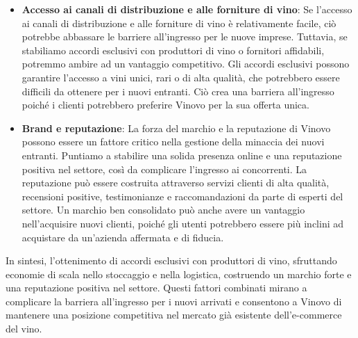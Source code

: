 \documentclass[12pt, a4paper]{article}
\begin{document}
\begin{itemize}
    \item \textbf{Accesso ai canali di distribuzione e alle forniture di vino}:
          Se l'accesso ai canali di distribuzione e alle forniture di vino è relativamente facile, ciò potrebbe abbassare le barriere all'ingresso per le nuove imprese. Tuttavia, se stabiliamo accordi esclusivi con produttori di vino o fornitori affidabili, potremmo ambire ad un vantaggio competitivo. Gli accordi esclusivi possono garantire l'accesso a vini unici, rari o di alta qualità, che potrebbero essere difficili da ottenere per i nuovi entranti. Ciò crea una barriera all'ingresso poiché i clienti potrebbero preferire Vinovo per la sua offerta unica.

    \item \textbf{Brand e reputazione}:
          La forza del marchio e la reputazione di Vinovo possono essere un fattore critico nella gestione della minaccia dei nuovi entranti. Puntiamo a stabilire una solida presenza online e una reputazione positiva nel settore, così da complicare l'ingresso ai concorrenti. La reputazione può essere costruita attraverso servizi clienti di alta qualità, recensioni positive, testimonianze e raccomandazioni da parte di esperti del settore. Un marchio ben consolidato può anche avere un vantaggio nell'acquisire nuovi clienti, poiché gli utenti potrebbero essere più inclini ad acquistare da un'azienda affermata e di fiducia.
\end{itemize}
In sintesi, l'ottenimento di accordi esclusivi con produttori di vino, sfruttando economie di scala nello stoccaggio e nella logistica, costruendo un marchio forte e una reputazione positiva nel settore. Questi fattori combinati mirano a complicare la barriera all'ingresso per i nuovi arrivati e consentono a Vinovo di mantenere una posizione competitiva nel mercato già esistente dell'e-commerce del vino.
\end{document}
